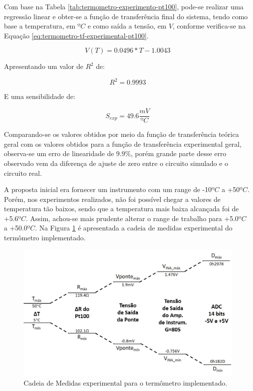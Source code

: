 \documentclass[a4paper]{instrumentacao}
\begin{document}
Com base na Tabela \ref{tab:termometro-experimento-pt100}, pode-se realizar uma regressão linear e obter-se a função de transferência final do sistema, tendo como base a temperatura, em $ºC$ e como saída a tensão, em $V$, conforme verifica-se na Equação \ref{eq:termometro-tf-experimental-pt100}.

\begin{equation}
	V(T)=0.0496*T-1.0043
	\label{eq:termometro-tf-experimental-pt100}
\end{equation}

Apresentando um valor de $R^2$ de:

\begin{equation}
	R^2=0.9993
	\label{eq:termometro-r2-tf-experimental-pt100}
\end{equation}

E uma sensibilidade de:

\begin{equation}
	S_{exp}=49.6\frac{mV}{ºC}
	\label{eq:termometro-sensibilidade-experimental-decada}
\end{equation}

Comparando-se os valores obtidos por meio da função de transferência teórica geral com os valores obtidos para a função de transferência experimental geral, observa-se um erro de linearidade de 9.9$\%$, porém grande parte desse erro observado vem da diferença de ajuste de zero entre o circuito simulado e o circuito real.

A proposta inicial era fornecer um instrumento com um range de -10$ºC$ a +50$ºC$. Porém, nos experimentos realizados, não foi possível chegar a valores de temperatura tão baixos, sendo que a temperatura mais baixa alcançada foi de +5.6$ºC$. Assim, achou-se mais prudente alterar o range de trabalho para +5.0$ºC$ a +50.0$ºC$. Na Figura \ref{fig:termometro-cadeia-medidas-experimental} é apresentada a cadeia de medidas experimental do termômetro implementado.

\begin{figure}[H]
	\centering \includegraphics[width=\textwidth]{termometro-cadeia-medidas-experimental.jpg}
	\caption{Cadeia de Medidas experimental para o termômetro implementado.}
	\label{fig:termometro-cadeia-medidas-experimental}
\end{figure}
\end{document}
